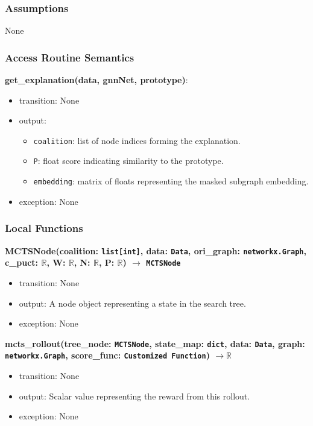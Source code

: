 \documentclass[12pt, titlepage]{article}
\begin{document}
\subsubsection{Assumptions}
None

\subsubsection{Access Routine Semantics}

\noindent \textbf{get\_explanation(data, gnnNet, prototype)}:
\begin{itemize}
  \item transition: None
  \item output:
  \begin{itemize}
    \item \texttt{coalition}: list of node indices forming the explanation.
    \item \texttt{P}: float score indicating similarity to the prototype.
    \item \texttt{embedding}: matrix of floats representing the masked subgraph embedding.
  \end{itemize}
  \item exception: None
\end{itemize}

\subsubsection{Local Functions}

\noindent 
\textbf{MCTSNode(coalition: \texttt{list[int]}, data: \texttt{Data}, ori\_graph: \texttt{networkx.Graph}, c\_puct: \(\mathbb{R}\), W: \(\mathbb{R}\), N: \(\mathbb{R}\), P: \(\mathbb{R}\)) \(\rightarrow\) \texttt{MCTSNode}}
\begin{itemize}
  \item transition: None
  \item output: A node object representing a state in the search tree.
  \item exception: None
\end{itemize}

\noindent 
\textbf{mcts\_rollout(tree\_node: \texttt{MCTSNode}, state\_map: \texttt{dict}, data: \texttt{Data}, graph: \texttt{networkx.Graph}, score\_func: \texttt{Customized Function}) \(\rightarrow \mathbb{R}\)}
\begin{itemize}
  \item transition: None
  \item output: Scalar value representing the reward from this rollout.
  \item exception: None
\end{itemize}
\end{document}
